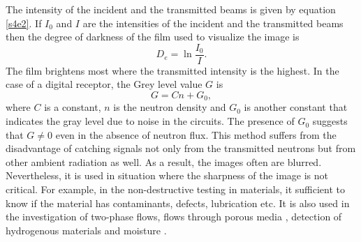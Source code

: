 \documentclass{article}
\numberwithin{equation}{section}
\begin{document}
The intensity of the incident and the transmitted beams is given by equation
\eqref{s4e2}. If $I_0$ and $I$ are the intensities of the incident and the
transmitted beams then the degree of darkness of the film used to visualize
the image is
\begin{equation}\label{s8e1}
D_e = \ln\frac{I_0}{I}.
\end{equation}
The film brightens most where the transmitted intensity is the highest. In the
case of a digital receptor, the Grey level value $G$ is
\begin{equation}\label{s8e2}
G = Cn + G_0,
\end{equation}
where $C$ is a constant, $n$ is the neutron density and $G_0$ is another 
constant that indicates the gray level due to noise in the circuits. The 
presence of $G_0$ suggests that $G \ne 0$ even in the absence of neutron flux.
This method suffers from the disadvantage of catching signals not only from
the transmitted neutrons but from other ambient radiation as well. As a result,
the images often are blurred. Nevertheless, it is used in situation where the
sharpness of the image is not critical. For example, in the non-destructive
testing in materials, it sufficient to know if the material has contaminants,
defects, lubrication etc. It is also used in the investigation of two-phase
flows, flows through porous media \cite{anderson2008neutron}, detection of
hydrogenous materials and moisture \cite{richards2004neutron}.
\end{document}
